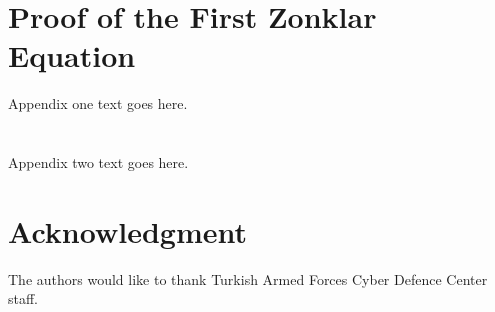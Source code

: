 \documentclass[journal]{IEEEtran}
\begin{document}
\appendices
\section{Proof of the First Zonklar Equation}
Appendix one text goes here.

\section{}
Appendix two text goes here.


\section*{Acknowledgment}


The authors would like to thank Turkish Armed Forces Cyber Defence Center staff.
\ifCLASSOPTIONcaptionsoff
  \newpage
\fi





%
%
%




%
\end{document}

